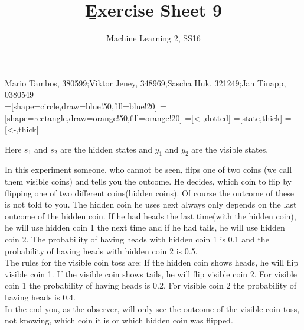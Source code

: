 \documentclass[a4paper]{article}
\newcommand{\1}{\mathds{1}}
\begin{document}
\title{\b{Exercise Sheet 9}}
\author{Machine Learning 2, SS16}

\maketitle

Mario Tambos, 380599;\quad Viktor Jeney, 348969;\quad Sascha Huk, 321249;\quad Jan Tinapp, 0380549\\

=[shape=circle,draw=blue!50,fill=blue!20]
=[shape=rectangle,draw=orange!50,fill=orange!20]
=[<-,dotted]
=[state,thick]
=[<-,thick]

\begin{figure}[htbp]
	\begin{center}
	\end{center}
\end{figure}
Here $s_1$ and $s_2$ are the hidden states and $y_1$ and $y_2$ are the visible states.


In this experiment someone, who cannot be seen, flips one of two coins (we call them visible coins) and tells you the outcome. He decides, which coin to flip by flipping one of two different coins(hidden coins). Of course the outcome of these is not told to you. The hidden coin he uses next always only depends on the last outcome of the hidden coin. If he had heads the last time(with the hidden coin), he will use hidden coin 1 the next time and if he had tails, he will use hidden coin 2. The probability of having heads with hidden coin 1 is 0.1 and the probability of having heads with hidden coin 2 is 0.5.\\
The rules for the visible coin toss are: If the hidden coin shows heads, he will flip visible coin 1. If the visible coin shows tails, he will flip visible coin 2. For visible coin 1 the probability of having heads is 0.2. For visible coin 2 the probability of having heads is 0.4.\\
In the end you, as the observer, will only see the outcome of the visible coin toss, not knowing, which coin it is or which hidden coin was flipped.
\end{document}
